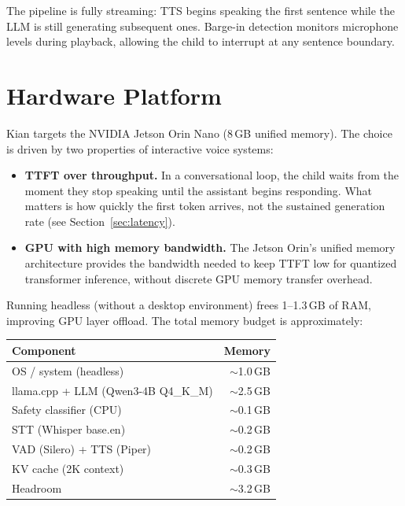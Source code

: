 \documentclass[11pt]{article}
\begin{document}
\noindent The pipeline is fully streaming:
TTS begins speaking the first sentence while the LLM is still generating subsequent ones.
Barge-in detection monitors microphone levels during playback,
allowing the child to interrupt at any sentence boundary.

\section{Hardware Platform}

Kian targets the NVIDIA Jetson Orin Nano (8\,GB unified memory).
The choice is driven by two properties of interactive voice systems:

\begin{itemize}[nosep]
  \item \textbf{TTFT over throughput.}
    In a conversational loop, the child waits from the moment they stop speaking until the assistant begins responding.
    What matters is how quickly the first token arrives, not the sustained generation rate (see Section~\ref{sec:latency}).
  \item \textbf{GPU with high memory bandwidth.}
    The Jetson Orin's unified memory architecture provides the bandwidth needed to keep TTFT low for quantized transformer inference,
    without discrete GPU memory transfer overhead.
\end{itemize}

\noindent Running headless (without a desktop environment) frees 1--1.3\,GB of RAM, improving GPU layer offload.
The total memory budget is approximately:

\begin{table}[H]
\centering
\begin{tabular}{lr}
\toprule
Component & Memory \\
\midrule
OS / system (headless) & $\sim$1.0\,GB \\
llama.cpp + LLM (Qwen3-4B Q4\_K\_M) & $\sim$2.5\,GB \\
Safety classifier (CPU) & $\sim$0.1\,GB \\
STT (Whisper base.en) & $\sim$0.2\,GB \\
VAD (Silero) + TTS (Piper) & $\sim$0.2\,GB \\
KV cache (2K context) & $\sim$0.3\,GB \\
\midrule
Headroom & $\sim$3.2\,GB \\
\bottomrule
\end{tabular}
\end{table}
\end{document}
